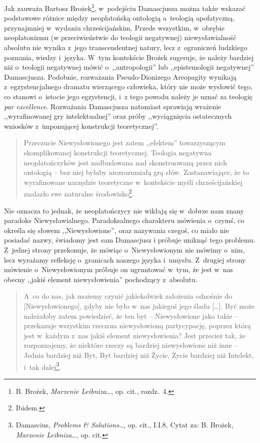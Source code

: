 Jak zauważa Bartosz Brożek\footnote{B. Brożek, \textit{Marzenie Leibniza}\ldots, op. cit., rozdz.~4.}, w~podejściu Damascjusza można także wskazać podstawowe różnice między neoplatońską ontologią a~teologią apofatyczną, przynajmniej w~wydaniu chrześcijańskim. Przede wszystkim, w~obrębie neoplatonizmu (w przeciwieństwie do teologii negatywnej) niewysławialność absolutu nie wynika z~jego transcendentnej natury, lecz z~ograniczeń ludzkiego poznania, wiedzy i~języka. W~tym kontekście Brożek sugeruje, że należy bardziej niż o~teologii negatywnej mówić o~,,antropologii'' lub ,,epistemologii negatywnej'' Damascjusza. Podobnie, rozważania Pseudo-Dionizego Areopagity wynikają z~egzystencjalnego dramatu wierzącego człowieka, który nie może wysłowić tego, co stanowi o~istocie jego egzystencji, i~z tego powodu należy je uznać za teologię \textit{par excellence}. Rozważania Damascjusza natomiast sprawiają wrażenie ,,wyrafinowanej gry intelektualnej'' oraz próby ,,wyciągnięcia ostatecznych wniosków z~imponującej konstrukcji teoretycznej''.

\begin{quote}
Przeczucie Niewysłowionego jest zatem ,,efektem'' towarzyszącym skomplikowanej konstrukcji teoretycznej. Teologia negatywna neoplatończyków jest nadbudowana nad skonstruowaną przez nich ontologią -- bez niej byłaby niezrozumiałą grą słów. Zastanawiające, że to wyrafinowane narzędzie teoretyczne w~kontekście myśli chrześcijańskiej znalazło swe naturalne środowisko\footnote{Ibidem.}.
\end{quote}

Nie oznacza to jednak, że neoplatończycy nie wikłają się w~dobrze nam znany paradoks Niewysławialnego. Paradoksalnego charakteru mówienia o~czymś, co określa się słowem ,,Niewysłowione'', oraz nazywania czegoś, co miało nie posiadać nazwy, świadomy jest sam Damascjusz i próbuje uniknąć tego problemu. Z~jednej strony przekonuje, że mówiąc o~Niewysłowionym nie mówimy o~nim, lecz wyrażamy refleksję o~granicach naszego języka i~umysłu. Z~drugiej strony mówienie o~Niewysłowionym próbuje on ugruntować w~tym, że jest w~nas obecny ,,jakiś element niewysłowienia'' pochodzący z~absolutu.

\begin{quote}
A~co do nas, jak możemy czynić jakiekolwiek założenia odnośnie do [Niewysłowionego], gdyby nie było w~nas jakiegoś jego śladu [\ldots]. Być może należałoby zatem powiedzieć, że ten byt -- Niewysłowione jako takie -- przekazuje wszystkim rzeczom niewysłowioną partycypację, poprzez którą jest w~każdym z~nas jakiś element niewysłowienia? Jest przecież tak, że rozpoznajemy, że niektóre rzeczy są bardziej niewysłowione niż inne -- Jednia bardziej niż Byt, Byt bardziej niż Życie, Życie bardziej niż Intelekt, i~tak dalej\footnote{Damascius, \textit{Problems \& Solutions}\ldots, op. cit., I.I.8, Cytat za: B. Brożek, \textit{Marzenie Leibniza}\ldots, op. cit.}.
\end{quote}

